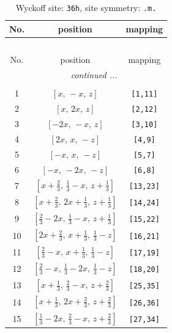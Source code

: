 \documentclass[fleqn,8pt]{jsarticle}
\begin{document}
\begin{longtable}{ccc}
\caption{Wyckoff site: {\tt 36h}, site symmetry: {\tt .m.}}
 \\
 \hline \hline
No. & position & mapping \\ \hline \endfirsthead

\multicolumn{2}{l}{\tablename\ \thetable{}} \\
 \hline \hline
No. & position & mapping \\ \hline \endhead

 \hline \hline
\multicolumn{2}{r}{\footnotesize\it continued ...} \\ \endfoot

 \hline \hline
\multicolumn{2}{r}{} \\ \endlastfoot

1 & $\left[ x,\, - x,\, z \right]$ & {\tt [1,11]} \\ \hline
2 & $\left[ x,\, 2 x,\, z \right]$ & {\tt [2,12]} \\ \hline
3 & $\left[ - 2 x,\, - x,\, z \right]$ & {\tt [3,10]} \\ \hline
4 & $\left[ 2 x,\, x,\, - z \right]$ & {\tt [4,9]} \\ \hline
5 & $\left[ - x,\, x,\, - z \right]$ & {\tt [5,7]} \\ \hline
6 & $\left[ - x,\, - 2 x,\, - z \right]$ & {\tt [6,8]} \\ \hline
7 & $\left[ x + \frac{2}{3},\, \frac{1}{3} - x,\, z + \frac{1}{3} \right]$ & {\tt [13,23]} \\ \hline
8 & $\left[ x + \frac{2}{3},\, 2 x + \frac{1}{3},\, z + \frac{1}{3} \right]$ & {\tt [14,24]} \\ \hline
9 & $\left[ \frac{2}{3} - 2 x,\, \frac{1}{3} - x,\, z + \frac{1}{3} \right]$ & {\tt [15,22]} \\ \hline
10 & $\left[ 2 x + \frac{2}{3},\, x + \frac{1}{3},\, \frac{1}{3} - z \right]$ & {\tt [16,21]} \\ \hline
11 & $\left[ \frac{2}{3} - x,\, x + \frac{1}{3},\, \frac{1}{3} - z \right]$ & {\tt [17,19]} \\ \hline
12 & $\left[ \frac{2}{3} - x,\, \frac{1}{3} - 2 x,\, \frac{1}{3} - z \right]$ & {\tt [18,20]} \\ \hline
13 & $\left[ x + \frac{1}{3},\, \frac{2}{3} - x,\, z + \frac{2}{3} \right]$ & {\tt [25,35]} \\ \hline
14 & $\left[ x + \frac{1}{3},\, 2 x + \frac{2}{3},\, z + \frac{2}{3} \right]$ & {\tt [26,36]} \\ \hline
15 & $\left[ \frac{1}{3} - 2 x,\, \frac{2}{3} - x,\, z + \frac{2}{3} \right]$ & {\tt [27,34]} \\ \hline

\end{longtable}
\end{document}
